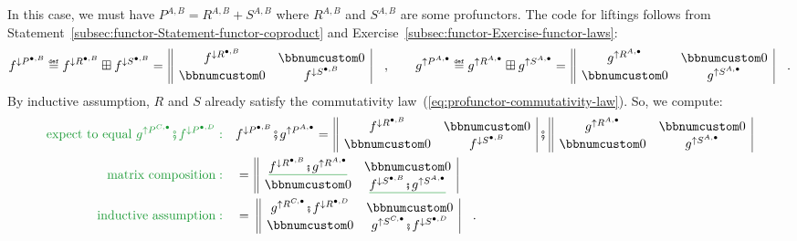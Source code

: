 In this case, we must have $P^{A,B}=R^{A,B}+S^{A,B}$ where $R^{A,B}$
and $S^{A,B}$ are some profunctors. The code for liftings follows
from Statement~\ref{subsec:functor-Statement-functor-coproduct}
and Exercise~\ref{subsec:functor-Exercise-functor-laws}:
\[
f^{\downarrow P^{\bullet,B}}\triangleq f^{\downarrow R^{\bullet,B}}\boxplus f^{\downarrow S^{\bullet,B}}=\,\begin{array}{||cc|}
f^{\downarrow R^{\bullet,B}} & \bbnum 0\\
\bbnum 0 & f^{\downarrow S^{\bullet,B}}
\end{array}\quad,\quad\quad g^{\uparrow P^{A,\bullet}}\triangleq g^{\uparrow R^{A,\bullet}}\boxplus g^{\uparrow S^{A,\bullet}}=\,\begin{array}{||cc|}
g^{\uparrow R^{A,\bullet}} & \bbnum 0\\
\bbnum 0 & g^{\uparrow S^{A,\bullet}}
\end{array}\quad.
\]
By inductive assumption, $R$ and $S$ already satisfy the commutativity
law~(\ref{eq:profunctor-commutativity-law}). So, we compute:
\begin{align*}
{\color{greenunder}\text{expect to equal }g^{\uparrow P^{C,\bullet}}\bef f^{\downarrow P^{\bullet,D}}:}\quad & f^{\downarrow P^{\bullet,B}}\bef g^{\uparrow P^{A,\bullet}}=\,\begin{array}{||cc|}
f^{\downarrow R^{\bullet,B}} & \bbnum 0\\
\bbnum 0 & f^{\downarrow S^{\bullet,B}}
\end{array}\,\bef\,\begin{array}{||cc|}
g^{\uparrow R^{A,\bullet}} & \bbnum 0\\
\bbnum 0 & g^{\uparrow S^{A,\bullet}}
\end{array}\\
{\color{greenunder}\text{matrix composition}:}\quad & =\,\begin{array}{||cc|}
\gunderline{f^{\downarrow R^{\bullet,B}}\bef g^{\uparrow R^{A,\bullet}}} & \bbnum 0\\
\bbnum 0 & \gunderline{f^{\downarrow S^{\bullet,B}}\bef g^{\uparrow S^{A,\bullet}}}
\end{array}\\
{\color{greenunder}\text{inductive assumption}:}\quad & =\,\,\begin{array}{||cc|}
g^{\uparrow R^{C,\bullet}}\bef f^{\downarrow R^{\bullet,D}} & \bbnum 0\\
\bbnum 0 & g^{\uparrow S^{C,\bullet}}\bef f^{\downarrow S^{\bullet,D}}
\end{array}\quad.
\end{align*}
